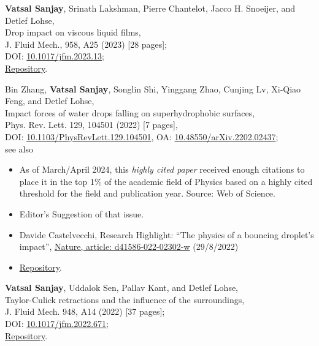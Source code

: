 \documentclass[10pt,a4paper,colorlinks,linkcolor=blue,urlcolor=blue,citecolor=blue]{moderncv}
\begin{document}
\begin{enumerate}[leftmargin=1.5em,label=\textbf{[\arabic*]}]
	\item \textbf{Vatsal Sanjay}, Srinath Lakshman, Pierre Chantelot, Jacco H. Snoeijer, and Detlef Lohse,\\
	Drop impact on viscous liquid films,\\
	J. Fluid Mech., 958, A25 (2023) [28 pages];\\
	\faFile\hspace{0.2em}DOI: \href{https://doi.org/10.1017/jfm.2023.13}{10.1017/jfm.2023.13};\\
	\faGithub\hspace{0.2em}\href{https://github.com/VatsalSy/Drop-impact-on-viscous-liquid-films}{Repository}.

	\item Bin Zhang, \textbf{Vatsal Sanjay}, Songlin Shi, Yinggang Zhao, Cunjing Lv, Xi-Qiao Feng, and Detlef Lohse,\\
	Impact forces of water drops falling on superhydrophobic surfaces,\\
	Phys. Rev. Lett. 129, 104501 (2022) [7 pages],\\
	\faLock\hspace{0.2em}DOI: \href{https://doi.org/10.1103/PhysRevLett.129.104501}{10.1103/PhysRevLett.129.104501}, \faFile\hspace{0.2em}OA: \href{https://doi.org/10.48550/arXiv.2202.02437}{10.48550/arXiv.2202.02437};\\
	see also
	\begin{itemize}
		\item
		\faChartLine\hspace{0.2em}As of March/April 2024, this \textit{highly cited paper} received enough citations to place it in the top 1\% of the academic field of Physics based on a highly cited threshold for the field and publication year. Source: Web of Science.
		\item
		\faStar\hspace{0.2em}Editor's Suggestion of that issue.
		\item
		Davide Castelvecchi, Research Highlight: ``The physics of a bouncing droplet's impact'', \href{https://www.nature.com/articles/d41586-022-02302-w}{Nature, article: d41586-022-02302-w} (29/8/2022)
		\item
		\faGithub\hspace{0.2em}\href{https://github.com/VatsalSy/Impact-forces-of-water-drops-falling-on-superhydrophobic-surfaces}{Repository}.
	\end{itemize}

	\item \textbf{Vatsal Sanjay}, Uddalok Sen, Pallav Kant, and Detlef Lohse,\\
	Taylor-Culick retractions and the influence of the surroundings,\\
	J. Fluid Mech. 948, A14 (2022) [37 pages];\\
	\faFile\hspace{0.2em}DOI: \href{https://doi.org/10.1017/jfm.2022.671}{10.1017/jfm.2022.671};\\
	\faGithub\hspace{0.2em}\href{https://github.com/VatsalSy/Taylor-Culick-retractions}{Repository}.


\end{enumerate}
\end{document}
